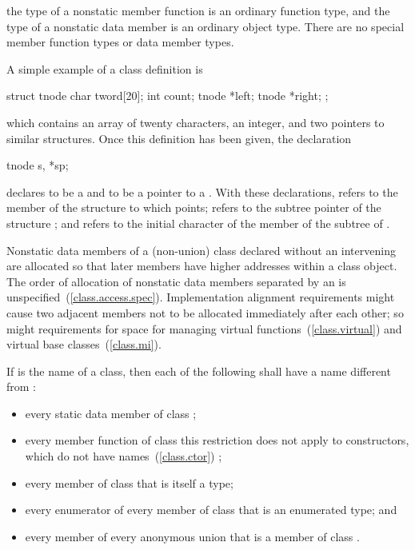 \pnum
\enternote
the type of a nonstatic member function is an ordinary function type,
and the type of a nonstatic data member is an ordinary object type.
There are no special member function types or data member types.
\exitnote

\pnum
{}%
\enterexample
A simple example of a class definition is

\begin{codeblock}
struct tnode {
    char tword[20];
    int count;
    tnode *left;
    tnode *right;
};
\end{codeblock}

which contains an array of twenty characters, an integer, and two
pointers to similar structures. Once this definition has been
given, the declaration

\begin{codeblock}
tnode s, *sp;
\end{codeblock}

declares  to be a  and  to be a pointer
to a . With these declarations,  refers to
the  member of the structure to which  points;
 refers to the  subtree pointer of the structure
; and  refers to the initial character
of the  member of the  subtree of .
\exitexample

\pnum
{}%
Nonstatic data members of a (non-union) class
declared without an intervening 
are allocated so that later
members have higher addresses within a class object.
%
The order of allocation of nonstatic data members separated by an
is unspecified~(\ref{class.access.spec}).
Implementation alignment requirements might cause two adjacent members
not to be allocated immediately after each other; so might requirements
for space for managing virtual functions~(\ref{class.virtual}) and
virtual base classes~(\ref{class.mi}).

\pnum
If  is the name of a class, then each of the following shall
have a name different from :

\begin{itemize}
\item every static data member of class ;

\item every member function of class 
\enternote
this restriction does not apply to constructors, which do not have
names~(\ref{class.ctor})
\exitnote;

\item every member of class  that is itself a type;

\item every enumerator of every member of class  that is an
enumerated type; and

\item every member of every anonymous union that is a member of class
.
\end{itemize}

